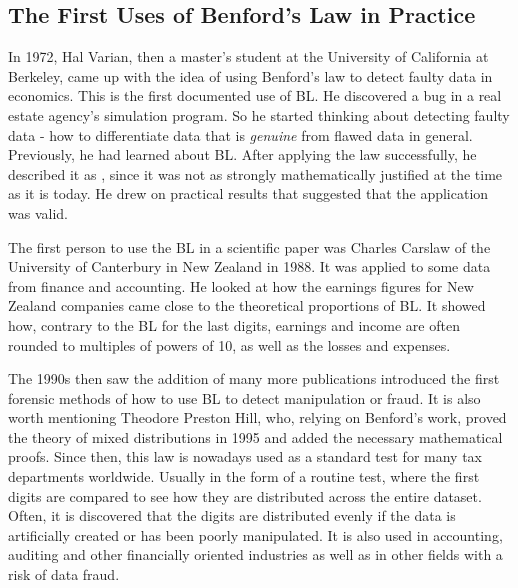 \subsection{The First Uses of Benford's Law in Practice}  

In 1972, Hal Varian, then a master's student at the University of California at Berkeley, came up with the idea of using Benford's law to detect faulty data in economics. This is the first documented use of BL. %
He discovered a bug in a real estate agency’s simulation program. So he started thinking about detecting faulty data - how to differentiate data that is \emph{genuine} from flawed data in general. Previously, he had learned about BL. After applying the law successfully, he described it as \emph{}, since it was not as strongly mathematically justified at the time as it is today. He drew on practical results that suggested that the application was valid. \cite{kossovsky2014benford} %

The first person to use the BL in a scientific paper was Charles Carslaw of the University of Canterbury in New Zealand in 1988. It was applied to some data from finance and accounting. He looked at how the earnings figures for New Zealand companies came close to the theoretical proportions of BL. It showed how, contrary to the BL for the last digits, %
earnings and income are often rounded to multiples of powers of 10, as well as the losses and expenses. \cite{kossovsky2014benford} %

The 1990s then saw the addition of many more publications %
introduced the first forensic methods of how to use BL to detect manipulation or fraud. It is also worth mentioning Theodore Preston Hill, who, relying on Benford's work, proved the theory of mixed distributions in 1995 and added the necessary mathematical proofs. %
Since then, this law is nowadays used as a standard test for many tax departments worldwide. Usually in the form of a routine test, where the first digits are compared to see how they are distributed across the entire dataset. Often, it is discovered that the digits are distributed evenly if the data is artificially created or has been poorly manipulated. It is also used in accounting, auditing and other financially oriented industries as well as in other fields with a risk of data fraud. \cite{kossovsky2014benford} %


